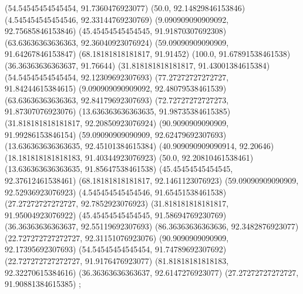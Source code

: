 {{{		(54.54545454545454, 91.7360476923077)
		(50.0, 92.14829846153846)
		(4.545454545454546, 92.33144769230769)
		(9.090909090909092, 92.75685846153846)
		(45.45454545454545, 91.91870307692308)
		(63.63636363636363, 92.36040923076924)
		(59.09090909090909, 91.64267846153847)
		(68.18181818181817, 91.91452)
		(100.0, 91.67891538461538)
		(36.36363636363637, 91.76644)
		(31.818181818181817, 91.43001384615384)
		(54.54545454545454, 92.12309692307693)
		(77.27272727272727, 91.84244615384615)
		(9.090909090909092, 92.48079538461539)
		(63.63636363636363, 92.84179692307693)
		(72.72727272727273, 91.87307076923076)
		(13.636363636363635, 91.98735384615385)
		(31.818181818181817, 92.20850923076924)
		(90.9090909090909, 91.99286153846154)
		(59.09090909090909, 92.62479692307693)
		(13.636363636363635, 92.45101384615384)
		(40.909090909090914, 92.20646)
		(18.181818181818183, 91.40344923076923)
		(50.0, 92.20810461538461)
		(13.636363636363635, 91.85647538461538)
		(45.45454545454545, 92.37612461538461)
		(68.18181818181817, 92.1461123076923)
		(59.09090909090909, 92.52936923076923)
		(4.545454545454546, 91.65451538461538)
		(27.27272727272727, 92.7852923076923)
		(31.818181818181817, 91.95004923076922)
		(45.45454545454545, 91.58694769230769)
		(36.36363636363637, 92.55119692307693)
		(86.36363636363636, 92.3482876923077)
		(22.727272727272727, 92.31151076923076)
		(90.9090909090909, 92.17395692307693)
		(54.54545454545454, 91.74789692307692)
		(22.727272727272727, 91.9176476923077)
		(81.81818181818183, 92.32270615384616)
		(36.36363636363637, 92.6147276923077)
		(27.27272727272727, 91.90881384615385)
	};

}}
